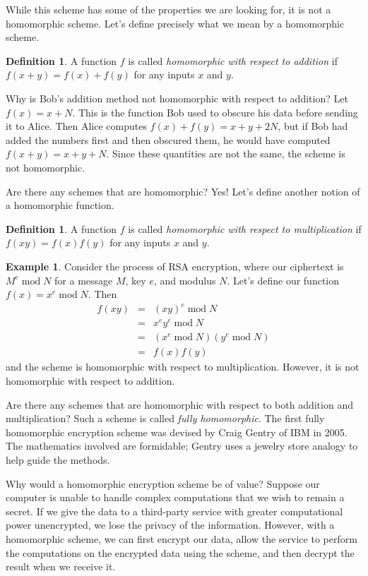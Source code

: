 \documentclass{book}
\theoremstyle{plain}
\theoremstyle{definition}
\newtheorem{definition}[theorem]{Definition}
\newtheorem{example}[theorem]{Example}
\renewcommand{\mod}{\operatorname{mod}}
\renewcommand{\mod}{\operatorname{mod}}
\begin{document}
While this scheme has some of the properties we are looking for, it is not a homomorphic scheme. Let's define precisely what we mean by a homomorphic scheme.

\begin{definition}
A function $f$ is called {\it homomorphic with respect to addition} if $f(x+y) = f(x) + f(y)$ for any inputs $x$ and $y$.
\end{definition}

Why is Bob's addition method not homomorphic with respect to addition? Let $f(x) = x+N$. This is the function Bob used to obscure his data before sending it to Alice. Then Alice computes $f(x) + f(y) = x+y+2N$, but if Bob had added the numbers first and then obscured them, he would have computed $f(x+y) = x+y+N$. Since these quantities are not the same, the scheme is not homomorphic.

Are there any schemes that are homomorphic? Yes! Let's define another notion of a homomorphic function.

\begin{definition}
A function $f$ is called {\it homomorphic with respect to multiplication} if $f(xy) = f(x)f(y)$ for any inputs $x$ and $y$.
\end{definition}

\begin{example}
Consider the process of RSA encryption, where our ciphertext is $M^e \mod N$ for a message $M$, key $e$, and modulus $N$. Let's define our function $f(x) = x^e \mod N$. Then
\begin{eqnarray*}
f(xy) &=& (xy)^e \mod N \\
&=& x^ey^e \mod N \\
&=& (x^e \mod N)(y^e \mod N) \\
&=& f(x)f(y)
\end{eqnarray*}
and the scheme is homomorphic with respect to multiplication. However, it is not homomorphic with respect to addition.
\end{example}

Are there any schemes that are homomorphic with respect to both addition and multiplication? Such a scheme is called {\it fully homomorphic}. The first fully homomorphic encryption scheme was devised by Craig Gentry of IBM in 2005. The mathematics involved are formidable; Gentry uses a jewelry store analogy to help guide the methods.

Why would a homomorphic encryption scheme be of value? Suppose our computer is unable to handle complex computations that we wish to remain a secret. If we give the data to a third-party service with greater computational power unencrypted, we lose the privacy of the information. However, with a homomorphic scheme, we can first encrypt our data, allow the service to perform the computations on the encrypted data using the scheme, and then decrypt the result when we receive it.
\end{document}
